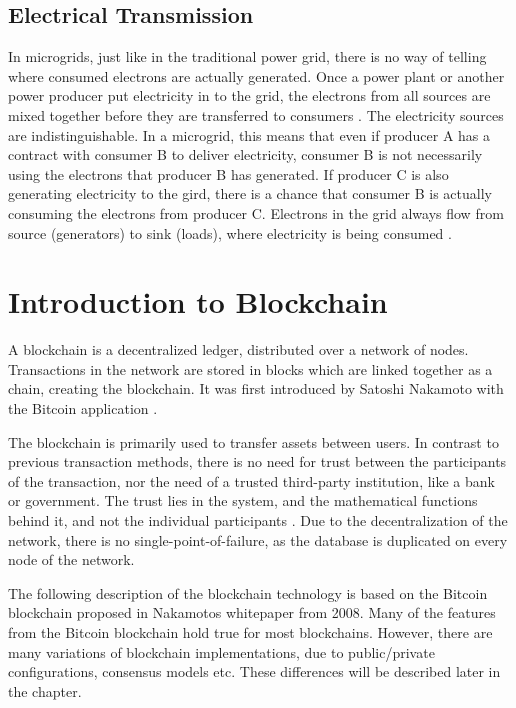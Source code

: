 \subsection{Electrical Transmission}
In microgrids, just like in the traditional power grid, there is no way of telling where consumed electrons are actually generated. Once a power plant or another power producer put electricity in to the grid, the electrons from all sources are mixed together before they are transferred to consumers \cite{timneypower}. The electricity sources are indistinguishable. In a microgrid, this means that even if producer A has a contract with consumer B to deliver electricity, consumer B is not necessarily using the electrons that producer B has generated. If producer C is also generating electricity to the gird, there is a chance that consumer B is actually consuming the electrons from producer C. Electrons in the grid always flow from source (generators) to sink (loads), where electricity is being consumed \cite{tracing}. 

\section{Introduction to Blockchain} \label{blockchain_basics}
A blockchain is a decentralized ledger, distributed over a network of nodes. Transactions in the network are stored in blocks which are linked together as a chain, creating the blockchain. It was first introduced by Satoshi Nakamoto with the Bitcoin application \cite{Nakamoto_bitcoin}.

The blockchain is primarily used to transfer assets between users. In contrast to previous transaction methods, there is no need for trust between the participants of the transaction, nor the need of a trusted third-party institution, like a bank or government. The trust lies in the system, and the mathematical functions behind it, and not the individual participants \cite{Nofer}. Due to the decentralization of the network, there is no single-point-of-failure, as the database is duplicated on every node of the network.

The following description of the blockchain technology is based on the Bitcoin blockchain proposed in Nakamotos whitepaper from 2008\cite{Nakamoto_bitcoin}. Many of the features from the Bitcoin blockchain hold true for most blockchains. However, there are many variations of blockchain implementations, due to public/private configurations, consensus models etc. These differences will be described later in the chapter.


